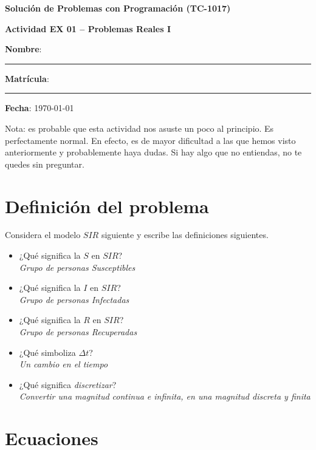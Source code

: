 \documentclass[spanish, 10pt]{article}
\begin{document}
\begin{center}
	{\Large \textbf{Solución de Problemas con Programación (TC-1017)}}
	
	\bigskip
	{\large \textbf{Actividad EX 01 -- Problemas Reales I}}
\end{center}

\bigskip
{\large \textbf{Nombre}: \rule{13.7 cm}{0.4mm}}



\bigskip
{\large \textbf{Matrícula}: \rule{5 cm}{0.4mm}} \hfill {\large \textbf{Fecha}: \today}

\bigskip

{\footnotesize Nota: es probable que esta actividad nos asuste un poco al principio. Es perfectamente normal.
En efecto, es de mayor dificultad a las que hemos visto anteriormente y probablemente haya dudas.
Si hay algo que no entiendas, no te quedes sin preguntar.}

\section{Definición del problema}

Considera el modelo $SIR$ siguiente y escribe las definiciones siguientes.

\begin{itemize}
    \item ¿Qué significa la $S$ en $SIR$? \\[1ex] \textit{Grupo de personas Susceptibles}
    \item ¿Qué significa la $I$ en $SIR$? \\[1ex] \textit{Grupo de personas Infectadas}
    \item ¿Qué significa la $R$ en $SIR$? \\[1ex] \textit{Grupo de personas Recuperadas}
    \item ¿Qué simboliza $\Delta t$? \\[1ex] \textit{Un cambio en el tiempo}
    \item ¿Qué significa \textit{discretizar}? \\[1ex] \textit{Convertir una magnitud continua e infinita, en una magnitud discreta y finita}
\end{itemize}


\section{Ecuaciones}
\end{document}
